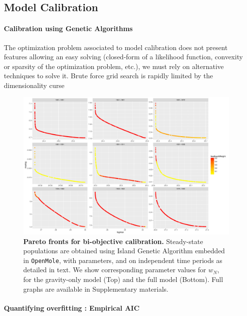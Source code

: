 \documentclass[Royal,sageh,times]{sagej}
\begin{document}
\subsection*{Model Calibration}



\paragraph{Calibration using Genetic Algorithms}


The optimization problem associated to model calibration does not present features allowing an easy solving (closed-form of a likelihood function, convexity or sparsity of the optimization problem, etc.), we must rely on alternative techniques to solve it. Brute force grid search is rapidly limited by the dimensionality curse


\begin{figure}
\centering
\includegraphics[width=\textwidth]{figures/allperiods_feedbackWeight}
\caption{\textbf{Pareto fronts for bi-objective calibration.} Steady-state populations are obtained using Island Genetic Algorithm embedded in \texttt{OpenMole}, with parameters, and on independent time periods as detailed in text. We show  corresponding parameter values for $w_N$, for the gravity-only model (Top) and the full model (Bottom). Full graphs are available in Supplementary materials.}
\end{figure}



\paragraph{Quantifying overfitting : Empirical AIC}
\end{document}
